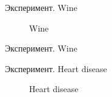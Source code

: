 \documentclass{beamer}
\begin{document}
\begin{frame}{Эксперимент. Wine}

\begin{figure}[H]
      \caption{Wine}
\end{figure}

\end{frame}
\begin{frame}{Эксперимент. Wine}

\end{frame}
\begin{frame}{Эксперимент. Heart disease}

\begin{figure}[H]
      \caption{Heart disease}
\end{figure}

\end{frame}
\end{document}
